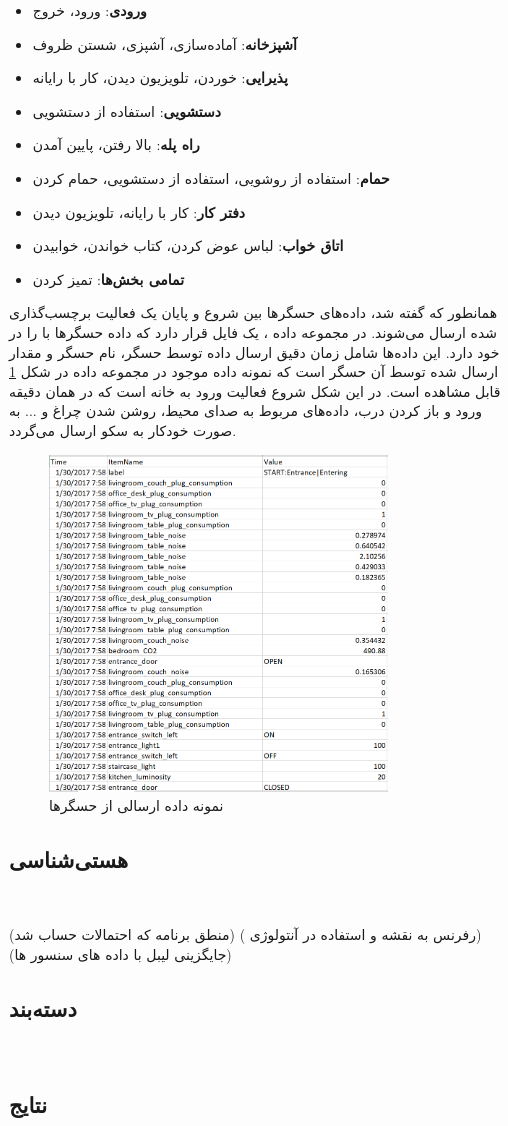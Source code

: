 \begin{itemize}
\item \textbf{ورودی}: ورود، خروج
\item \textbf{آشپزخانه}: آماده‌سازی، آشپزی، شستن ظروف
\item \textbf{پذیرایی}: خوردن، تلویزیون دیدن، کار با رایانه
\item \textbf{دستشویی}: استفاده از دستشویی
\item \textbf{راه پله}: بالا رفتن، پایین آمدن
\item \textbf{حمام}: استفاده از روشویی، استفاده از دستشویی، حمام کردن
\item \textbf{دفتر کار}: کار با رایانه، تلویزیون دیدن
\item \textbf{اتاق خواب}: لباس عوض کردن، کتاب خواندن، خوابیدن
\item \textbf{تمامی بخش‌ها}: تمیز کردن
\end{itemize}

همانطور که گفته شد، داده‌های حسگرها بین شروع و پایان یک فعالیت برچسب‌گذاری شده ارسال می‌شوند. در مجموعه داده ، یک فایل  قرار دارد که داده حسگرها با را در خود دارد. این داده‌ها شامل زمان دقیق ارسال داده توسط حسگر، نام حسگر و مقدار ارسال شده توسط آن حسگر است که نمونه داده‌ موجود در مجموعه داده در شکل \ref{fig:fO4H3} قابل مشاهده است. در این شکل شروع فعالیت ورود به خانه است که در همان دقیقه ورود و باز کردن درب، داده‌های مربوط به صدای محیط، روشن شدن چراغ و ... به صورت خودکار به سکو ارسال می‌گردد.

\begin{figure}[H]
\centerline{\includegraphics[width=0.8\textwidth]{figs/fO4H3.png}}
\caption{نمونه داده ارسالی از حسگرها}
\label{fig:fO4H3}
\end{figure}

\subsection{هستی‌شناسی}‌


(منطق برنامه که احتمالات حساب شد)
( رفرنس به نقشه و استفاده در آنتولوژی)
(جایگزینی لیبل با داده های سنسور ها)

\subsection{دسته‌بند}‌

\subsection{نتایج}‌

